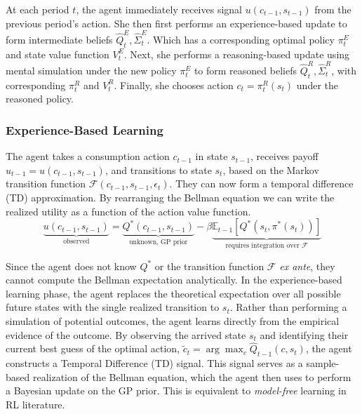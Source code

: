 \begin{definition} \label{def:learning_cycle}
    At each period $t$, the agent immediately receives signal $u(c_{t-1}, s_{t-1})$ from the previous period's action.
    She then first performs an experience-based update to form intermediate beliefs $\hat{Q}^E_t, \hat{\Sigma}^E_t$.
    Which has a corresponding optimal policy $\pi^E_t$ and state value function $V^E_t$.
    Next, she performs a reasoning-based update using mental simulation under the new policy $\pi^E_t$ to form
    reasoned beliefs $\hat{Q}^R_t, \hat{\Sigma}^R_t$, with corresponding $\pi^R_t$ and $V^R_t$.
    Finally, she chooses action $c_t = \pi^R_t(s_t)$ under the reasoned policy.
\end{definition}


\subsubsection{Experience-Based Learning}

The agent takes a consumption action $c_{t-1}$ in state $s_{t-1}$, receives
payoff $u_{t-1} = u(c_{t-1}, s_{t-1})$, and transitions to state $s_t$, based on
the Markov transition function $\mathcal{F}(c_{t-1}, s_{t-1}, \epsilon_t)$. They can
now form a temporal difference (TD) approximation. By rearranging the
Bellman equation we can write the realized utility as a function of the action value function.
\begin{equation}
    \underbrace{u(c_{t-1}, s_{t-1})}_{\text{observed}} = \underbrace{Q^*(c_{t-1}, s_{t-1})}_{\text{unknown, GP prior}} - \beta \underbrace{\mathbb{E}_{t-1}[Q^*(s_t, \pi^*(s_t))]}_{\text{requires integration over } \mathcal{F}}
\end{equation}

Since the agent does not know $Q^*$ or the transition function $\mathcal{F}$ 
\textit{ex ante}, they cannot compute the Bellman expectation analytically. In the 
experience-based learning phase, the agent replaces the theoretical expectation over 
all possible future states with the single realized transition to $s_t$. Rather than 
performing a simulation of potential outcomes, the agent learns directly from the 
empirical evidence of the outcome. By observing the arrived state $s_t$ and identifying 
their current best guess of the optimal action, $\tilde{c}_t = \arg\max_{c} \hat{Q}_{t-1}(c, s_t)$, 
the agent constructs a Temporal Difference (TD) signal. This signal serves as a 
sample-based realization of the Bellman equation, which the agent then uses to 
perform a Bayesian update on the GP prior. This is equivalent to \textit{model-free}
learning in RL literature. 


